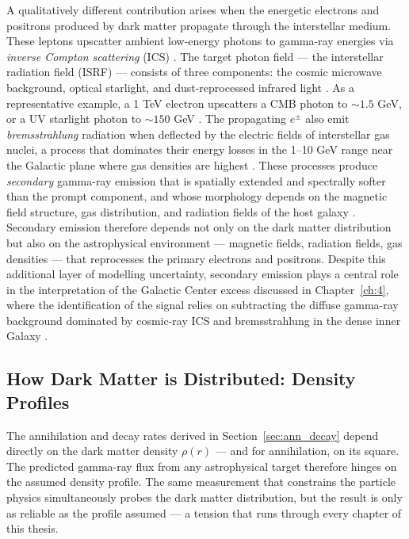 A qualitatively different contribution arises when the energetic electrons and positrons produced by dark matter propagate through the interstellar medium.
These leptons upscatter ambient low-energy photons to gamma-ray energies via \textit{inverse Compton scattering} (ICS) \cite{Blumenthal:1970gc,Hooper:2024}.
The target photon field --- the interstellar radiation field (ISRF) --- consists of three components: the cosmic microwave background, optical starlight, and dust-reprocessed infrared light \cite{Strong:2007nh}.
As a representative example, a 1 TeV electron upscatters a CMB photon to $\sim 1.5$ GeV, or a UV starlight photon to $\sim 150$ GeV \cite{Cirelli:2024ssz}.
The propagating $e^\pm$ also emit \textit{bremsstrahlung} radiation when deflected by the electric fields of interstellar gas nuclei, a process that dominates their energy losses in the 1--10 GeV range near the Galactic plane where gas densities are highest \cite{Blumenthal:1970gc,Dermer:2009zz}.
These processes produce \textit{secondary} gamma-ray emission that is spatially extended and spectrally softer than the prompt component, and whose morphology depends on the magnetic field structure, gas distribution, and radiation fields of the host galaxy \cite{Strong:2007nh,Hooper:2024}.
Secondary emission therefore depends not only on the dark matter distribution but also on the astrophysical environment --- magnetic fields, radiation fields, gas densities --- that reprocesses the primary electrons and positrons.
Despite this additional layer of modelling uncertainty, secondary emission plays a central role in the interpretation of the Galactic Center excess discussed in Chapter~\ref{ch:4}, where the identification of the signal relies on subtracting the diffuse gamma-ray background dominated by cosmic-ray ICS and bremsstrahlung in the dense inner Galaxy \cite{Hooper:2024}.

\subsection{How Dark Matter is Distributed: Density Profiles}
\label{sec:density_profiles}

The annihilation and decay rates derived in Section~\ref{sec:ann_decay} depend directly on the dark matter density $\rho(r)$ --- and for annihilation, on its square.
The predicted gamma-ray flux from any astrophysical target therefore hinges on the assumed density profile.
The same measurement that constrains the particle physics simultaneously probes the dark matter distribution, but the result is only as reliable as the profile assumed --- a tension that runs through every chapter of this thesis.

